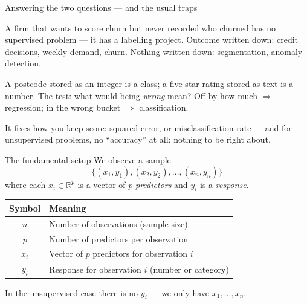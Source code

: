 \documentclass[aspectratio=169,11pt]{beamer}
\begin{document}
\begin{frame}{Answering the two questions --- and the usual traps}
  \vspace{-1mm}
  \begin{readme}
    A firm that wants to score churn but never recorded who churned has no supervised problem
    --- it has a labelling project. Outcome written down: credit decisions, weekly demand,
    churn. Nothing written down: segmentation, anomaly detection.
  \end{readme}
  \begin{readme}
    A postcode stored as an integer is a class; a five-star rating stored as text is a number.
    The test: what would being \emph{wrong} mean? Off by how much $\Rightarrow$ regression; in
    the wrong bucket $\Rightarrow$ classification.
  \end{readme}
  \begin{takeaway}
    It fixes how you keep score: squared error, or misclassification rate --- and for
    unsupervised problems, no ``accuracy'' at all: nothing to be right about.
  \end{takeaway}
\end{frame}

\begin{frame}{The fundamental setup}
  We observe a sample
  \[
    \boxed{\;\{(x_1, y_1), (x_2, y_2), \ldots, (x_n, y_n)\}\;}
  \]
  where each $x_i \in \mathbb{R}^p$ is a vector of $p$ \emph{predictors}
  and $y_i$ is a \emph{response}.
  \begin{readme}
    \begin{tabular}{@{}cl@{}}
      \toprule
      \textbf{Symbol} & \textbf{Meaning} \\
      \midrule
      $n$ & Number of observations (sample size) \\
      $p$ & Number of predictors per observation \\
      $x_i$ & Vector of $p$ predictors for observation $i$ \\
      $y_i$ & Response for observation $i$ (number or category) \\
      \bottomrule
    \end{tabular}
  \end{readme}
  In the unsupervised case there is no $y_i$ --- we only have
  $x_1, \ldots, x_n$.
\end{frame}
\end{document}
